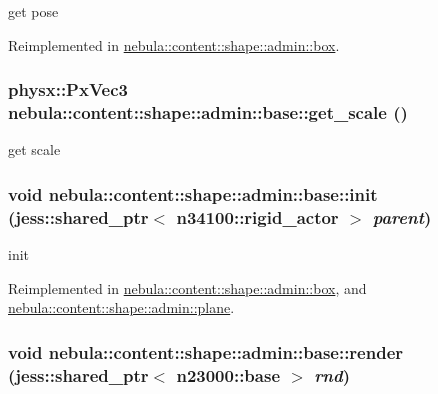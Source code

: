 get pose 

Reimplemented in \hyperlink{classnebula_1_1content_1_1shape_1_1admin_1_1box_a90262710172c5f4318565794f75939be}{nebula::content::shape::admin::box}.\hypertarget{classnebula_1_1content_1_1shape_1_1admin_1_1base_aa009d3d8d7bf323330031756b1cc090f}{
\subsubsection[{get\_\-scale}]{\setlength{\rightskip}{0pt plus 5cm}physx::PxVec3 nebula::content::shape::admin::base::get\_\-scale ()}}
\label{classnebula_1_1content_1_1shape_1_1admin_1_1base_aa009d3d8d7bf323330031756b1cc090f}


get scale \hypertarget{classnebula_1_1content_1_1shape_1_1admin_1_1base_ae02304c56a4c72ac3b845e71289f450b}{
\subsubsection[{init}]{\setlength{\rightskip}{0pt plus 5cm}void nebula::content::shape::admin::base::init (jess::shared\_\-ptr$<$ {\bf n34100::rigid\_\-actor} $>$ {\em parent})}}
\label{classnebula_1_1content_1_1shape_1_1admin_1_1base_ae02304c56a4c72ac3b845e71289f450b}


init 

Reimplemented in \hyperlink{classnebula_1_1content_1_1shape_1_1admin_1_1box_ade143fc2e0cf69ac51d898d4a2cb574d}{nebula::content::shape::admin::box}, and \hyperlink{classnebula_1_1content_1_1shape_1_1admin_1_1plane_a6d4175d9e25c15ed2d4f07c0ba7ccb2e}{nebula::content::shape::admin::plane}.\hypertarget{classnebula_1_1content_1_1shape_1_1admin_1_1base_a02bf1999dd948c5e0b8a73136b949f84}{
\subsubsection[{render}]{\setlength{\rightskip}{0pt plus 5cm}void nebula::content::shape::admin::base::render (jess::shared\_\-ptr$<$ {\bf n23000::base} $>$ {\em rnd})}}
\label{classnebula_1_1content_1_1shape_1_1admin_1_1base_a02bf1999dd948c5e0b8a73136b949f84}



